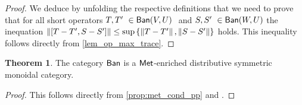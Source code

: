\documentclass[10pt,a4paper]{amsart}
\theoremstyle{definition}
\theoremstyle{definition}
\theoremstyle{definition}
\theoremstyle{definition}
\theoremstyle{definition}
\theoremstyle{definition}
\newtheorem{theorem}[definition]{Theorem}
\begin{document}
  \begin{proof}
    We deduce by unfolding the respective definitions that we need to prove that for all short operators $T, T' \in \catBan(V,U)  $ and $S, S' \in \catBan(W,U) $ the inequation $\left\lVert [T-T', S-S'] \right\rVert \leq  \sup \left\{ \left\lVert T-T' \right\rVert, \left\lVert S-S' \right\rVert \right\}$ holds. This inequality follows directly from \autoref{lem_op_max_trace}.
  \end{proof}

  \begin{theorem}
      The category $\mathsf{Ban}$ is a $\mathsf{Met}$-enriched distributive symmetric monoidal category.
  \end{theorem}

\begin{proof}
    This follows directly from \autoref{prop:met_cond_pp} and \cite[Theorem 4.3]{dahlqvist2023syntactic}.
\end{proof} 
\end{document}
